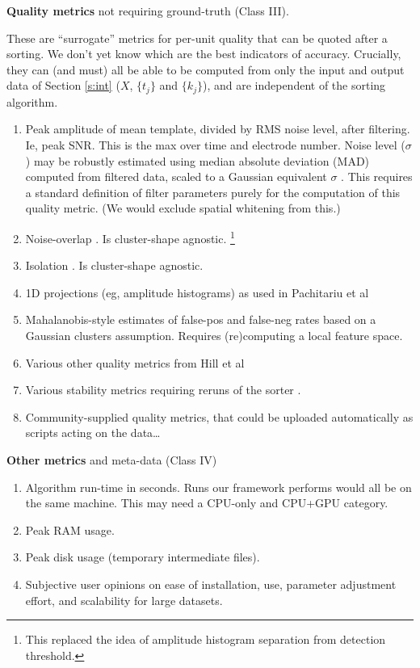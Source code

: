\documentclass[10pt]{article}
\newcommand{\ben}{\begin{enumerate}}
\newcommand{\een}{\end{enumerate}}
\begin{document}
\item {\bf Quality metrics} not requiring ground-truth (Class III).
  
  These are ``surrogate'' metrics for per-unit quality that
  can be quoted after a sorting.
  We don't yet know which are the best indicators of accuracy.
  Crucially, they can (and must) all be able to be
  computed from only the input and output data of Section \eqref{s:int}
  ($X$, $\{t_j\}$ and $\{k_j\}$),
  and are independent of the sorting algorithm.
  \ben
\item Peak amplitude of mean template, divided by RMS noise level,
  after filtering.
  Ie, peak SNR. This is the max over time and electrode number.
  Noise level ($\sigma$)
  may be robustly estimated using median absolute deviation (MAD) computed
  from filtered data,
  scaled to a Gaussian equivalent $\sigma$ \cite[(3.1)]{spc}.
  This requires a standard definition of filter parameters purely for the
  computation of this quality metric.
  (We would exclude spatial whitening from this.)
\item Noise-overlap \cite{mountainsort}. Is cluster-shape agnostic.
  \footnote{This replaced the idea of amplitude histogram separation from detection threshold.}
\item Isolation \cite{mountainsort}. Is cluster-shape agnostic.
\item 1D projections (eg, amplitude histograms) as used in Pachitariu et al \cite{kilosort}
\item Mahalanobis-style estimates of false-pos and false-neg rates
  based on a Gaussian clusters assumption. Requires (re)computing a local
  feature space.
  \item Various other quality metrics from Hill et al \cite{Hill2011}
  \item Various stability metrics requiring reruns of the sorter \cite{validspike}.
\item Community-supplied quality metrics, that could be uploaded automatically as scripts acting on the data\ldots
  \een

\item {\bf Other metrics} and meta-data (Class IV)
  \ben
\item Algorithm run-time in seconds. Runs our framework performs would
  all be on the same machine.
  This may need a CPU-only and CPU+GPU category.
\item Peak RAM usage.
\item Peak disk usage (temporary intermediate files).
\item Subjective user opinions on ease of installation, use, parameter adjustment effort, and scalability for large datasets.
  \een
  
\end{document}

